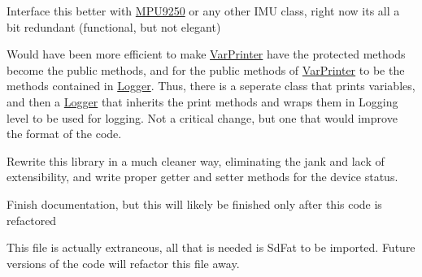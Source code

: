 
\begin{DoxyRefList}
\item[Class \mbox{\hyperlink{structIMUCalibration}{I\+M\+U\+Calibration}} ]\label{todo__todo000004}%
%
Interface this better with \mbox{\hyperlink{classMPU9250}{M\+P\+U9250}} or any other I\+MU class, right now it\textquotesingle{}s all a bit redundant (functional, but not elegant) 
\item[Class \mbox{\hyperlink{classLogger}{Logger}} ]\label{todo__todo000001}%
%
Would have been more efficient to make \mbox{\hyperlink{classVarPrinter}{Var\+Printer}} have the protected methods become the public methods, and for the public methods of \mbox{\hyperlink{classVarPrinter}{Var\+Printer}} to be the methods contained in \mbox{\hyperlink{classLogger}{Logger}}. Thus, there is a seperate class that prints variables, and then a \mbox{\hyperlink{classLogger}{Logger}} that inherits the print methods and wraps them in Logging level to be used for logging. Not a critical change, but one that would improve the format of the code.  
\item[Class \mbox{\hyperlink{classMPU9250}{M\+P\+U9250}} ]\label{todo__todo000002}%
%
Rewrite this library in a much cleaner way, eliminating the jank and lack of extensibility, and write proper getter and setter methods for the device status.

\label{todo__todo000003}%
%
Finish documentation, but this will likely be finished only after this code is refactored  
\item[File \mbox{\hyperlink{Tag__SD_8h}{Tag\+\_\+\+SD.h}} ]\label{todo__todo000005}%
%
This file is actually extraneous, all that is needed is Sd\+Fat to be imported. Future versions of the code will refactor this file away.
\end{DoxyRefList}